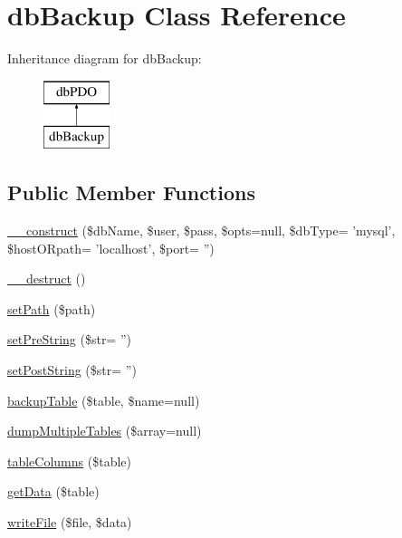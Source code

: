 \hypertarget{classdb_backup}{\section{db\-Backup Class Reference}
\label{classdb_backup}
}
Inheritance diagram for db\-Backup\-:\begin{figure}[H]
\begin{center}
\leavevmode
\includegraphics[height=2.000000cm]{classdb_backup}
\end{center}
\end{figure}
\subsection*{Public Member Functions}
\begin{DoxyCompactItemize}
\item 
\hyperlink{classdb_backup_a7f93adf2a111686240ea50fdd8bd8ebf}{\-\_\-\-\_\-construct} (\$db\-Name, \$user, \$pass, \$opts=null, \$db\-Type= 'mysql', \$host\-O\-Rpath= 'localhost', \$port= '')
\item 
\hyperlink{classdb_backup_a421831a265621325e1fdd19aace0c758}{\-\_\-\-\_\-destruct} ()
\item 
\hyperlink{classdb_backup_a5d101758b135bd36ba8992cc3bb67a24}{set\-Path} (\$path)
\item 
\hyperlink{classdb_backup_af9ff1acb357a6c171c60643144717694}{set\-Pre\-String} (\$str= '')
\item 
\hyperlink{classdb_backup_afe408bb74f4a63a1be4f8db787b59453}{set\-Post\-String} (\$str= '')
\item 
\hyperlink{classdb_backup_a75da871b294ce5ac4e4e1ab1ae0bc5d4}{backup\-Table} (\$table, \$name=null)
\item 
\hyperlink{classdb_backup_a18a10140bf184faeb780ce8493446c55}{dump\-Multiple\-Tables} (\$array=null)
\item 
\hyperlink{classdb_backup_a0aa0472caa524c75db0b2f9cddc594c5}{table\-Columns} (\$table)
\item 
\hyperlink{classdb_backup_ac05be54f45477b0eeb08b0693dfa48ac}{get\-Data} (\$table)
\item 
\hyperlink{classdb_backup_aaa28a36632ff9f6df04cc3bbc13a8118}{write\-File} (\$file, \$data)
\end{DoxyCompactItemize}
